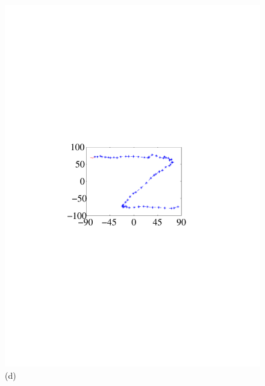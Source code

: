 \begin{figure}[!t]
{\begin{minipage}[t]{0.145\textwidth}
                \includegraphics[width=\textwidth]{fig/protection1-1.pdf}\\
                \centering \footnotesize (d)
             \end{minipage}
        }
        \hspace{-0.3cm}
\end{figure}
